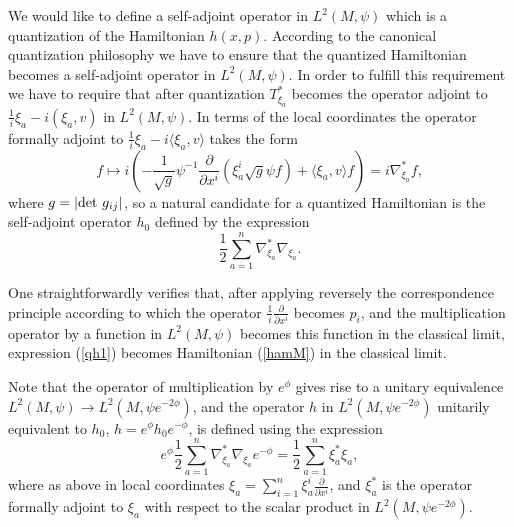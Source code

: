\documentclass{amsart}
\begin{document}
We would like to define a self-adjoint operator in $L^2(M,\psi)$ which is a quantization of the Hamiltonian $h(x,p)$. According to the canonical quantization philosophy we have to ensure that the quantized Hamiltonian becomes a self-adjoint operator in $L^2(M,\psi)$. In order to fulfill this requirement we have to require that after quantization $T_{\xi_a}^*$ becomes the operator adjoint to $\frac1i\xi_a-i(\xi_a,v)$ in $L^2(M,\psi)$. In terms of the local coordinates the operator formally adjoint to $\frac1i\xi_a-i\langle \xi_a,v\rangle $ takes the form 
$$
f\mapsto i\left( -\frac{1}{\sqrt{g}}\psi^{-1}\frac{\partial}{\partial x^i}(\xi_a^i\sqrt{g}\psi f)+\langle \xi_a,v\rangle f\right)=i\nabla_{\xi_a}^*f,
$$
where $g=|{\rm det}~g_{ij}|$, so a natural candidate for a quantized Hamiltonian is the self-adjoint operator $h_0$ defined by the expression
\begin{equation}\label{qh1}
\frac 12\sum_{a=1}^n\nabla_{\xi_a}^*\nabla_{\xi_a}.	
\end{equation}


One straightforwardly verifies that, after applying reversely the correspondence principle according to which the  operator $\frac1i\frac{\partial}{\partial x^i}$ becomes $p_i$, and the multiplication operator by a function in $L^2(M,\psi)$ becomes this function in the classical limit, expression (\ref{qh1}) becomes Hamiltonian (\ref{hamM}) in the classical limit.


Note that the operator of multiplication by $e^{\phi}$ gives rise to a unitary equivalence $L^2(M,\psi)\rightarrow L^2(M,\psi e^{-2\phi})$, and the operator $h$ in $L^2(M,\psi e^{-2\phi})$ unitarily equivalent to $h_0$, $h=e^{\phi}h_0e^{-\phi}$, is defined using the expression 
\begin{equation}\label{expr}
e^{\phi}\frac 12\sum_{a=1}^n\nabla_{\xi_a}^*\nabla_{\xi_a}e^{-\phi}=\frac 12\sum_{a=1}^n\xi_a^*\xi_a,	
\end{equation}
where as above in local coordinates $\xi_a=\sum_{i=1}^n\xi_a^i\frac{\partial}{\partial x^i}$, and $\xi_a^*$ is the operator formally adjoint to $\xi_a$ with respect to the scalar product in $L^2(M,\psi e^{-2\phi})$.
  
\end{document}
